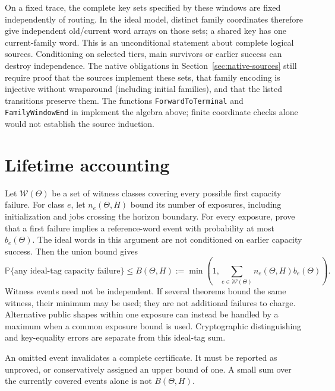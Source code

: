 \documentclass[11pt]{article}
\theoremstyle{definition}
\theoremstyle{remark}
\newcommand{\Prb}{\mathbb P}
\begin{document}
On a fixed trace, the complete key sets specified by these windows are
fixed independently of routing. In the ideal model, distinct family
coordinates therefore give independent old/current word arrays on those
sets; a shared key has one current-family word. This is an unconditional
statement about complete logical sources. Conditioning on selected tiers,
main survivors or earlier success can destroy independence. The native obligations in Section~\ref{sec:native-sources} still require
proof that the sources implement these sets, that family encoding is
injective without wraparound (including initial families), and that the
listed transitions preserve them.
The functions \texttt{ForwardToTerminal} and \texttt{FamilyWindowEnd}
in  implement
the algebra above; finite coordinate checks alone would not establish the
source induction.

\section{Lifetime accounting}\label{sec:ledger}
Let $\mathcal W(\Theta)$ be a set of witness classes covering every possible
first capacity failure. For class $e$, let $n_e(\Theta,H)$ bound its number
of exposures, including initialization and jobs crossing the horizon
boundary. For every exposure, prove that a first failure implies a
reference-word event with probability at most $b_e(\Theta)$. The ideal
words in this argument are not conditioned on earlier capacity success.
Then the union bound gives
\begin{equation}\label{eq:general-lifetime}
 \Prb\{\text{any ideal-tag capacity failure}\}
 \le B(\Theta,H)
 :=\min\!\left(1,\sum_{e\in\mathcal W(\Theta)}
               n_e(\Theta,H)b_e(\Theta)\right).
\end{equation}
Witness events need not be independent. If several theorems bound the
same witness, their minimum may be used; they are not additional failures
to charge. Alternative public shapes within one exposure can instead be
handled by a maximum when a common exposure bound is used. Cryptographic
distinguishing and key-equality errors are separate from this ideal-tag sum.

An omitted event invalidates a complete certificate. It must be reported
as unproved, or conservatively assigned an upper bound of one. A small sum
over the currently covered events alone is not $B(\Theta,H)$.
\end{document}
